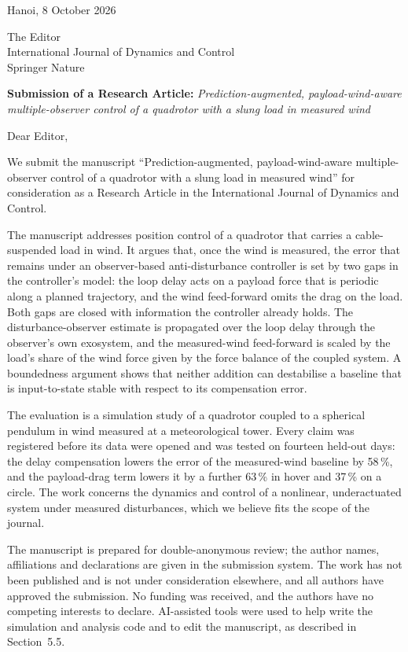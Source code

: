 \documentclass[11pt,a4paper]{article}
\begin{document}
\begin{flushright}
Hanoi, 8 October 2026
\end{flushright}

The Editor\\
International Journal of Dynamics and Control\\
Springer Nature

\textbf{Submission of a Research Article:} \emph{Prediction-augmented, payload-wind-aware multiple-observer control of
a quadrotor with a slung load in measured wind}

Dear Editor,

We submit the manuscript ``Prediction-augmented, payload-wind-aware multiple-observer control of a quadrotor with a
slung load in measured wind'' for consideration as a Research Article in the International Journal of Dynamics and
Control.

The manuscript addresses position control of a quadrotor that carries a cable-suspended load in wind. It argues that,
once the wind is measured, the error that remains under an observer-based anti-disturbance controller is set by two
gaps in the controller's model: the loop delay acts on a payload force that is periodic along a planned trajectory,
and the wind feed-forward omits the drag on the load. Both gaps are closed with information the controller already
holds. The disturbance-observer estimate is propagated over the loop delay through the observer's own exosystem, and
the measured-wind feed-forward is scaled by the load's share of the wind force given by the force balance of the
coupled system. A boundedness argument shows that neither addition can destabilise a baseline that is input-to-state
stable with respect to its compensation error.

The evaluation is a simulation study of a quadrotor coupled to a spherical pendulum in wind measured at a
meteorological tower. Every claim was registered before its data were opened and was tested on fourteen held-out
days: the delay compensation lowers the error of the measured-wind baseline by 58\,\%, and the payload-drag term
lowers it by a further 63\,\% in hover and 37\,\% on a circle. The work concerns the dynamics and control of a
nonlinear, underactuated system under measured disturbances, which we believe fits the scope of the journal.

The manuscript is prepared for double-anonymous review; the author names, affiliations and declarations are given in
the submission system. The work has not been published and is not under consideration elsewhere, and all authors have
approved the submission. No funding was received, and the authors have no competing interests to declare.
AI-assisted tools were used to help write the simulation and analysis code and to edit the manuscript, as described
in Section~5.5.
\end{document}
